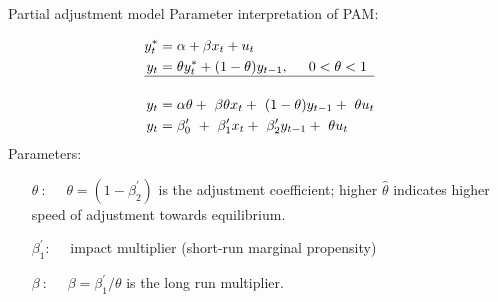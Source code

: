\documentclass{beamer}
\begin{document}
\begin{frame}{Partial adjustment model}
Parameter interpretation of PAM:

\begin{equation*}
\begin{aligned}
{y}_t^\ast &= \alpha + \beta x_t + u_t \\
y_t &= \theta {y}_t^\ast + (1-\theta)y_{t-1}, \hspace{0.5cm} 0 < \theta < 1 \\
\hline \\
y_t &= \alpha \theta +~ \beta \theta x_t +~ (1-\theta) y_{t-1} +~ \theta u_t \\
y_t &= \beta_0^{\prime} ~+~ \beta_1^{\prime} x_t +~ \beta_2^{\prime} y_{t-1} +~ \theta u_t
\end{aligned}
\end{equation*}
\medskip
Parameters:\\
\smallskip
\begin{itemize}
\item[$\theta~:\quad$] $\theta= (1-\beta_2^{\prime})$ is the adjustment coefficient; higher $\hat{\theta}$ indicates higher speed of adjustment towards equilibrium.\\
\smallskip
\item[$\beta_1^{\prime}:\quad$] impact multiplier (short-run marginal propensity)\\
\smallskip
\item [$\beta~:\quad$] $\beta =\beta_1^{\prime}/\theta$ is the long run multiplier.
\end{itemize}


\end{frame}

\end{document}
